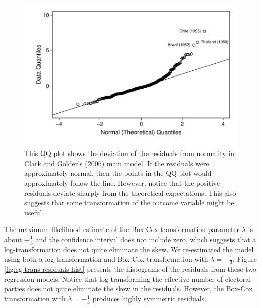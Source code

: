\documentclass[12pt]{article}
\begin{document}
\begin{figure}[h!]
\begin{center}
	\includegraphics[scale = 0.6]{figs/cg-qq-plot.pdf}
\caption{This QQ plot shows the deviation of the residuals from normality in Clark and Golder's (2006) main model. 
If the residuals were approximately normal, then the points in the QQ plot would approximately follow the line. 
However, notice that the positive residuals deviate sharply from the theoretical expectations. 
This also suggests that some transformation of the outcome variable might be useful.}\label{fig:cg-qq-plot}
\end{center}

\end{figure}

The maximum likelihood estimate of the Box-Cox transformation parameter $\lambda$ is about $-\frac{1}{3}$ and the confidence interval does not include zero, which suggests that a log-transformation does not quite eliminate the skew. 
We re-estimated the model using both a log-transformation and Box-Cox transformation with $\lambda = -\frac{1}{3}$. 
Figure \ref{fig:cg-trans-residuals-hist} presents the histograms of the residuals from these two regression models. 
Notice that log-transforming the effective number of electoral parties does not quite eliminate the skew in the residuals. However, the Box-Cox transformation with $\lambda = -\frac{1}{3}$ produces highly symmetric residuals. 
\end{document}

